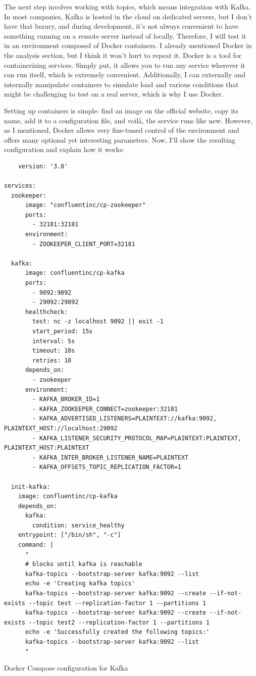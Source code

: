 \documentclass[10pt , a4paper]{report}
\newenvironment{code}{\captionsetup{type=listing}}{}
\begin{document}
The next step involves working with topics, which means integration with Kafka. In most companies, Kafka is hosted in the cloud on dedicated servers, but I don’t have that luxury, and during development, it’s not always convenient to have something running on a remote server instead of locally. Therefore, I will test it in an environment composed of Docker containers. I already mentioned Docker in the analysis section, but I think it won't hurt to repeat it. Docker is a tool for containerizing services. Simply put, it allows you to run any service wherever it can run itself, which is extremely convenient. Additionally, I can externally and internally manipulate containers to simulate load and various conditions that might be challenging to test on a real server, which is why I use Docker.

Setting up containers is simple: find an image on the official website, copy its name, add it to a configuration file, and voilà, the service runs like new. However, as I mentioned, Docker allows very fine-tuned control of the environment and offers many optional yet interesting parameters. Now, I'll show the resulting configuration and explain how it works:

\begin{code}
  \begin{verbatim}
    version: '3.8'

services:
  zookeeper:
      image: "confluentinc/cp-zookeeper"
      ports:
        - 32181:32181
      environment:
        - ZOOKEEPER_CLIENT_PORT=32181

  kafka:
      image: confluentinc/cp-kafka
      ports:
        - 9092:9092
        - 29092:29092
      healthcheck:
        test: nc -z localhost 9092 || exit -1
        start_period: 15s
        interval: 5s
        timeout: 10s
        retries: 10
      depends_on:
        - zookeeper
      environment:
        - KAFKA_BROKER_ID=1
        - KAFKA_ZOOKEEPER_CONNECT=zookeeper:32181
        - KAFKA_ADVERTISED_LISTENERS=PLAINTEXT://kafka:9092, PLAINTEXT_HOST://localhost:29092
        - KAFKA_LISTENER_SECURITY_PROTOCOL_MAP=PLAINTEXT:PLAINTEXT, PLAINTEXT_HOST:PLAINTEXT
        - KAFKA_INTER_BROKER_LISTENER_NAME=PLAINTEXT
        - KAFKA_OFFSETS_TOPIC_REPLICATION_FACTOR=1
    
  init-kafka:
    image: confluentinc/cp-kafka
    depends_on:
      kafka:
        condition: service_healthy
    entrypoint: ["/bin/sh", "-c"]
    command: |
      "
      # blocks until kafka is reachable
      kafka-topics --bootstrap-server kafka:9092 --list
      echo -e 'Creating kafka topics'
      kafka-topics --bootstrap-server kafka:9092 --create --if-not-exists --topic test --replication-factor 1 --partitions 1
      kafka-topics --bootstrap-server kafka:9092 --create --if-not-exists --topic test2 --replication-factor 1 --partitions 1
      echo -e 'Successfully created the following topics:'
      kafka-topics --bootstrap-server kafka:9092 --list
      "
  \end{verbatim}
  \caption{Docker Compose configuration for Kafka}
\end{code}
\end{document}
